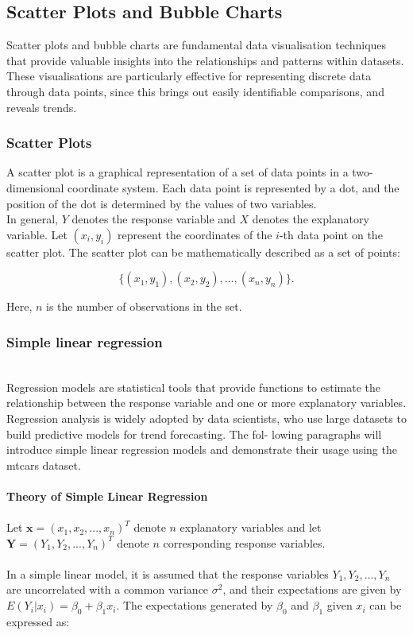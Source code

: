 \documentclass{article}\usepackage[]{graphicx}\usepackage[]{xcolor}
\begin{document}
\subsection{Scatter Plots and Bubble Charts}

Scatter plots and bubble charts are fundamental data visualisation techniques that provide valuable insights into the relationships and patterns within datasets. These visualisations are particularly effective for representing discrete data through data points, since this brings out easily identifiable comparisons, and reveals trends.

\subsubsection{Scatter Plots}

A scatter plot is a graphical representation of a set of data points in a two-dimensional coordinate system. Each data point is represented by a dot, and the position of the dot is determined by the values of two variables.\\

\noindent
In general, \(Y\) denotes the response variable and \(X\) denotes the explanatory variable. Let \((x_i, y_i)\) represent the coordinates of the \(i\)-th data point on the scatter plot. The scatter plot can be mathematically described as a set of points:

\[ \{(x_1, y_1), (x_2, y_2), \ldots, (x_n, y_n)\} .\]
  
\noindent
Here, \(n\) is the number of observations in the set.\\


\subsubsection{Simple linear regression}
\\Regression models are statistical tools that provide functions to estimate the relationship between the response variable and one or more explanatory variables. Regression analysis is widely adopted by data scientists, who use large datasets to build predictive models for trend forecasting. The fol- lowing paragraphs will introduce simple linear regression models and demonstrate their usage using the mtcars dataset.
\\  
\\   
\noindent
\textbf{Theory of Simple Linear Regression}
\\  
\\Let $\mathbf{x} = (x_1, x_2, ..., x_n)^T$ denote $n$ explanatory variables and let $\mathbf{Y} = (Y_1,Y_2,...,Y_n)^T$ denote $n$ corresponding response variables.
\\  
\\In a simple linear model, it is assumed that the response variables $Y_1,Y_2,...,Y_n$ are uncorrelated with a common variance $\sigma^2$, and their expectations are given by $E(Y_i| x_i) = \beta_0 + \beta_1 x_i$. The expectations generated by $\beta_0$ and $\beta_1$ given $x_i$ can be expressed as:
\end{document}
